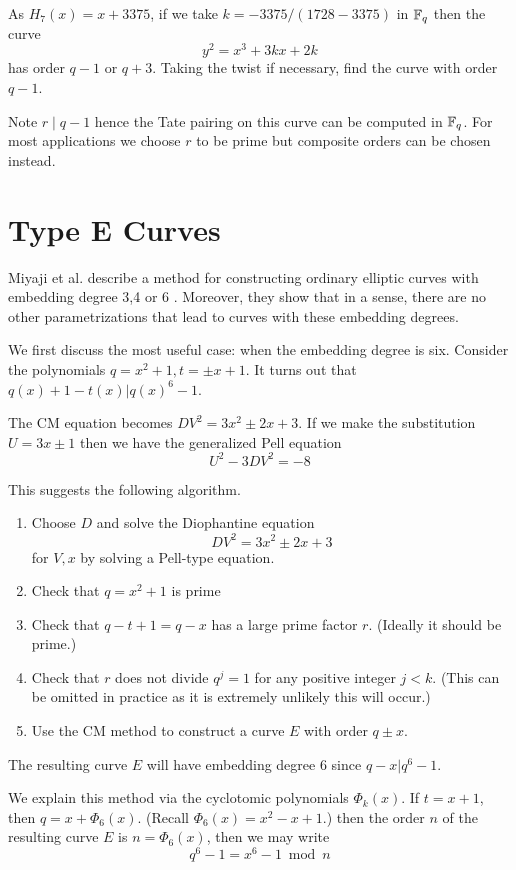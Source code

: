 As $H_7(x) = x + 3375$, if we take $k = -3375 / (1728 - 3375)$ in $\mathbb{F}_q$
then the curve
\[
y^2 = x^3 + 3k x + 2k
\]
has order $q - 1$ or $q + 3$. Taking the twist if necessary,
find the curve with order $q-1$.

Note $r \mid q-1$ hence the Tate pairing on this curve can be computed
in $\mathbb{F}_q$. For most applications we choose $r$ to be prime but composite
orders can be chosen instead.

\section {Type E Curves}

Miyaji et al. describe a method for constructing ordinary elliptic
curves with embedding degree 3,4 or 6 \cite{mnt}. Moreover, they show
that in a sense, there are no other parametrizations that lead to curves
with these embedding degrees.

We first discuss the most useful case: when the embedding degree is six.
Consider the polynomials $q = x^2 + 1, t = \pm x + 1$.
It turns out that $q(x) + 1 - t(x) | q(x)^6 - 1$.

The CM equation becomes $D V^2 = 3 x^2 \pm 2 x + 3$. If we make
the substitution $U = 3x \pm 1$ then we have the generalized Pell equation
\[
U^2 - 3DV^2 = -8
\]

This suggests the following algorithm.

\begin{enumerate}
\item
Choose $D$ and solve the Diophantine equation
\[ D V^2 = 3 x^2 \pm 2 x + 3 \]
for $V, x$ by solving a Pell-type equation.
\item
Check that $q = x^2 + 1$ is prime
\item
Check that $q - t + 1 = q - x$ has a large prime factor $r$.
(Ideally it should be prime.)
\item
Check that $r$ does not divide $q^j = 1$ for any positive integer $j < k$.
(This can be omitted in practice as it is extremely unlikely this will
occur.)
\item
Use the CM method to construct a curve $E$ with order $q \pm x$.
\end{enumerate}

The resulting curve $E$ will have embedding degree 6 since
$q-x | q^6 -1$.

We explain this method via the cyclotomic polynomials $\Phi_k(x)$.
If $t = x + 1$,
then $q = x + \Phi_6(x)$. (Recall $\Phi_6(x) = x^2 - x + 1$.)
then the order $n$ of the resulting
curve $E$ is $n = \Phi_6(x)$, then we may write
\[ q^6 - 1 = x^6 - 1 \bmod n \]


